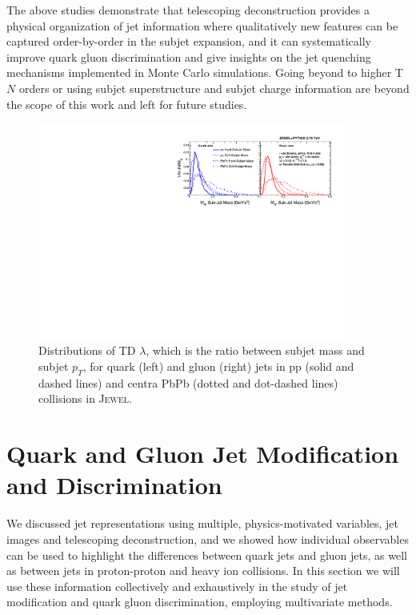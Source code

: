 \documentclass[notoc]{JHEP3}
\begin{document}
The above studies demonstrate that telescoping deconstruction provides a physical organization of jet information where qualitatively new features can be captured order-by-order in the subjet expansion, and it can systematically improve quark gluon discrimination and give insights on the jet quenching mechanisms implemented in Monte Carlo simulations. Going beyond to higher T$N$ orders or using subjet superstructure \cite{Gallicchio:2010sw} and subjet charge \cite{Krohn:2012fg} information are beyond the scope of this work and left for future studies.


\begin{figure}[t]
	   \centering
	   \includegraphics[width=0.9\textwidth]{plots/Comp_subjet_m.pdf}
	   \caption{Distributions of TD $\lambda$, which is the ratio between subjet mass and subjet $p_T$, for quark (left) and gluon (right) jets in pp (solid and dashed lines) and centra PbPb (dotted and dot-dashed lines) collisions in \textsc{Jewel}. }
\label{fig:comp_subjet_m}
\end{figure}

\section{Quark and Gluon Jet Modification and Discrimination}
\label{sec:results}

We discussed jet representations using multiple, physics-motivated variables, jet images and telescoping deconstruction, and we showed how individual observables can be used to highlight the differences between quark jets and gluon jets, as well as between jets in proton-proton and heavy ion collisions. In this section we will use these information collectively and exhaustively in the study of jet modification and quark gluon discrimination, employing multivariate methods.
\end{document}
